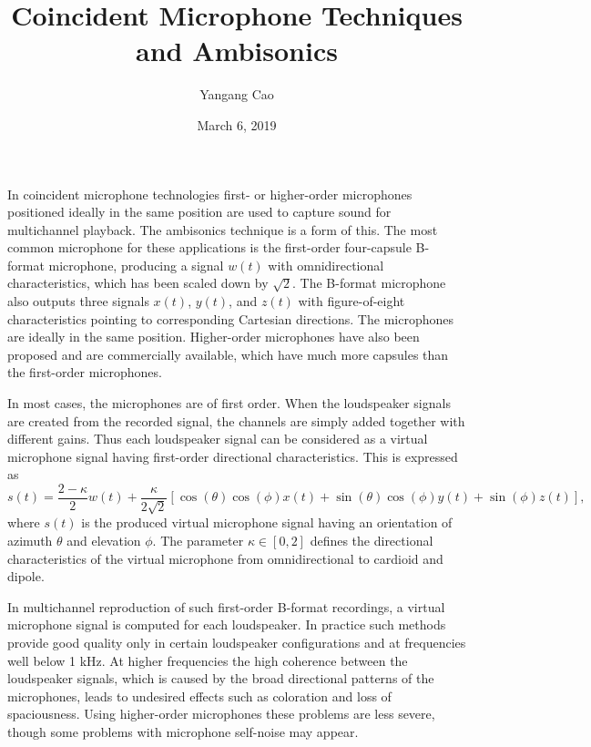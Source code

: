 \documentclass[10pt,a4paper,oneside]{article}
\author{Yangang Cao}
\date{March 6, 2019}
\begin{document}
\title{Coincident Microphone Techniques and Ambisonics}
\maketitle 

In coincident microphone technologies first- or higher-order microphones positioned ideally in
the same position are used to capture sound for multichannel playback. The ambisonics technique is a form of this. The most common microphone for these applications is the
first-order four-capsule B-format microphone, producing a signal $w(t)$ with omnidirectional characteristics, which has been scaled down by $\sqrt{2}$. The B-format microphone also outputs three signals $x(t)$, $y(t)$, and $z(t)$ with figure-of-eight characteristics pointing to corresponding Cartesian directions. The microphones are ideally in the same position. Higher-order microphones have also been proposed and are commercially available, which have much more capsules than the
first-order microphones.

In most cases, the microphones are of first order. When the loudspeaker signals are created
from the recorded signal, the channels are simply added together with different gains. Thus each loudspeaker signal can be considered as a virtual microphone signal having first-order directional characteristics. This is expressed as
\[
s(t)=\frac{2-\kappa}{2} w(t)+\frac{\kappa}{2 \sqrt{2}}[\cos (\theta) \cos (\phi) x(t)+\sin (\theta) \cos (\phi) y(t)+\sin (\phi) z(t)],
\]
where $s(t)$ is the produced virtual microphone signal having an orientation of azimuth $\theta$ and elevation $\phi$. The parameter $\kappa \in [0, 2]$ defines the directional characteristics of the virtual microphone from omnidirectional to cardioid and dipole.

In multichannel reproduction of such first-order B-format recordings, a virtual microphone signal is computed for each loudspeaker. In practice such methods provide good quality only in certain loudspeaker configurations and at frequencies well below 1 kHz. At higher frequencies the high coherence between the loudspeaker signals, which is caused by the broad directional patterns of the microphones, leads to undesired effects such as coloration and loss of spaciousness. Using higher-order microphones these problems are less severe, though some problems with microphone self-noise may appear.
\end{document}
